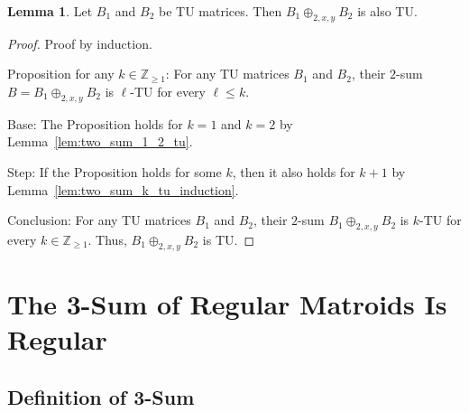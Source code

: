 \documentclass{article}
\theoremstyle{definition}
\newtheorem{lemma}[theorem]{Lemma}
\begin{document}
\begin{lemma}\label{lem:two_sum_tu}
    Let $B_{1}$ and $B_{2}$ be TU matrices. Then $B_{1} \oplus_{2, x, y} B_{2}$ is also TU.
\end{lemma}

\begin{proof}
    Proof by induction.

    Proposition for any $k \in \mathbb{Z}_{\geq 1}$: For any TU matrices $B_{1}$ and $B_{2}$, their $2$-sum $B = B_{1} \oplus_{2, x, y} B_{2}$ is $\ell$-TU for every $\ell \leq k$.

    Base: The Proposition holds for $k = 1$ and $k = 2$ by Lemma~\ref{lem:two_sum_1_2_tu}.

    Step: If the Proposition holds for some $k$, then it also holds for $k + 1$ by Lemma~\ref{lem:two_sum_k_tu_induction}.

    Conclusion: For any TU matrices $B_{1}$ and $B_{2}$, their $2$-sum $B_{1} \oplus_{2, x, y} B_{2}$ is $k$-TU for every $k \in \mathbb{Z}_{\geq 1}$. Thus, $B_{1} \oplus_{2, x, y} B_{2}$ is TU.
\end{proof}


\section{The 3-Sum of Regular Matroids Is Regular}

\subsection{Definition of 3-Sum}
\end{document}
